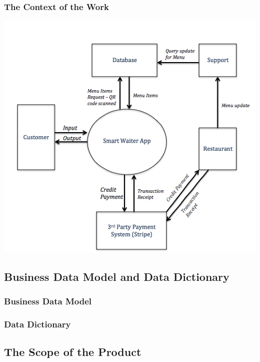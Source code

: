 \documentclass[12pt, titlepage]{article}
\begin{document}
\subsubsection{The Context of the Work} 
\includegraphics{Context.png}
\subsection{Business Data Model and Data Dictionary}
\subsubsection{Business Data Model}
\subsubsection{Data Dictionary}
\subsection{The Scope of the Product}
\end{document}
